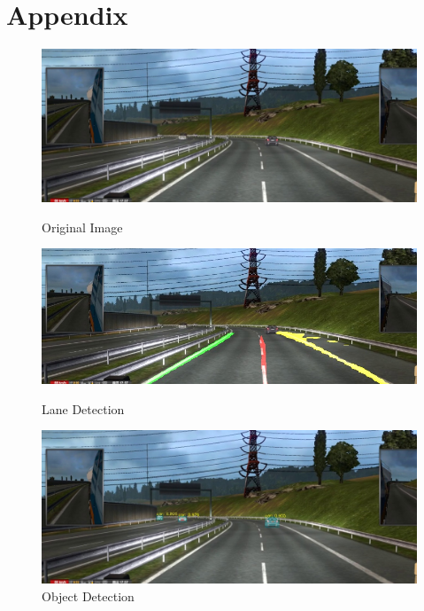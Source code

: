 \documentclass[runningheads]{llncs}
\begin{document}
\section{Appendix}
\begin{figure}[!htb]
      \includegraphics[width=\linewidth]{result/w000059.jpg}
      \caption{Original Image}\label{fig:Original_Image}
    \endminipage\hfill
      \includegraphics[width=\linewidth]{result/w000059-lane.jpg}
      \caption{Lane Detection}\label{fig:Lane_Line_Result}
    \endminipage\hfill
      \includegraphics[width=\linewidth]{result/w000059-obj.jpg}
      \caption{Object Detection}\label{fig:Object_result}
    \endminipage
\end{figure}
\end{document}
